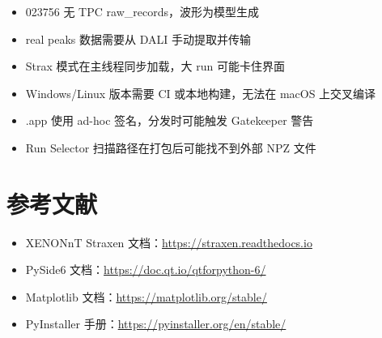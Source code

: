 \documentclass[12pt,a4paper]{article}
\begin{document}
\begin{itemize}[itemsep=3pt]
\item 023756 无 TPC raw\_records，波形为模型生成
\item real peaks 数据需要从 DALI 手动提取并传输
\item Strax 模式在主线程同步加载，大 run 可能卡住界面
\item Windows/Linux 版本需要 CI 或本地构建，无法在 macOS 上交叉编译
\item .app 使用 ad-hoc 签名，分发时可能触发 Gatekeeper 警告
\item Run Selector 扫描路径在打包后可能找不到外部 NPZ 文件
\end{itemize}

\section{参考文献}

\begin{itemize}[itemsep=2pt]
\item XENONnT Straxen 文档：\url{https://straxen.readthedocs.io}
\item PySide6 文档：\url{https://doc.qt.io/qtforpython-6/}
\item Matplotlib 文档：\url{https://matplotlib.org/stable/}
\item PyInstaller 手册：\url{https://pyinstaller.org/en/stable/}
\end{itemize}
\end{document}
